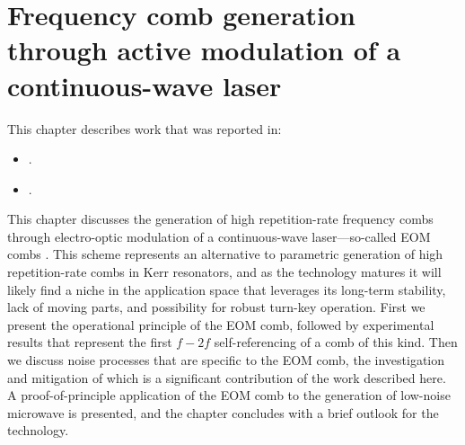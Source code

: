  \chapter{Frequency comb generation through active modulation of a continuous-wave laser}\label{chap:EOMCombs}
   \begin{footnotesize}
 	\begin{spacing}{1.2}
 		This chapter describes work that was reported in:
 		\begin{itemize}
 			\item {}.\\
 			\item {}.\\
 		\end{itemize}
 	\end{spacing}
 \end{footnotesize}

This chapter discusses the generation of high repetition-rate frequency combs through electro-optic modulation of a continuous-wave laser---so-called EOM combs \cite{Kobayashi1972,Kourogi1993,Murata2000,Sakamoto2007,Morohashi2008,Ishizawa2010,Wu2010,Supradeepa2012,Metcalf2013,Wu2013}. This scheme represents an alternative to parametric generation of high repetition-rate combs in Kerr resonators, and as the technology matures it will likely find a niche in the application space that leverages its long-term stability, lack of moving parts, and possibility for robust turn-key operation. First we present the operational principle of the EOM comb, followed by experimental results that represent the first $f-2f$ self-referencing of a comb of this kind. Then we discuss noise processes that are specific to the EOM comb, the investigation and mitigation of which is a significant contribution of the work described here. A proof-of-principle application of the EOM comb to the generation of low-noise microwave is presented, and the chapter concludes with a brief outlook for the technology.

